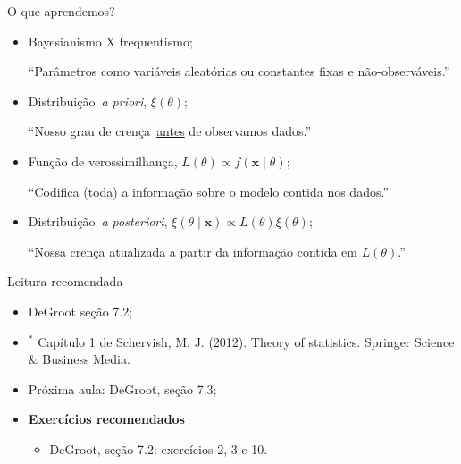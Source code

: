 \begin{frame}{O que aprendemos?}
\begin{itemize}
 \item[\faLightbulbO] Bayesianismo X frequentismo;
 
 ``Parâmetros como variáveis aleatórias ou constantes fixas e não-observáveis.''
 
 \item[\faHourglassStart] Distribuição~\textit{a priori}, $\xi(\theta)$;
 
 ``Nosso grau de crença~\underline{antes} de observamos dados.''
 
 \item[\faInfoCircle] Função de verossimilhança, $L(\theta) \propto f(\boldsymbol x \mid \theta)$;

 ``Codifica (toda) a informação sobre o modelo contida nos dados.''
 
 \item[\faHourglassEnd] Distribuição~\textit{a posteriori}, $\xi(\theta \mid \boldsymbol x) \propto L(\theta)\xi(\theta)$;
 
 ``Nossa crença atualizada a partir da informação contida em $L(\theta)$.''
 \end{itemize}
\end{frame}
\begin{frame}{Leitura recomendada}
\begin{itemize}
 \item[\faBook] DeGroot seção 7.2;
 \item[\faBook] $^\ast$ Capítulo 1 de Schervish, M. J. (2012). Theory of statistics. Springer Science \& Business Media.
 \item[\faForward] Próxima aula: DeGroot, seção 7.3;
 \item {\large\textbf{Exercícios recomendados}}
 \begin{itemize}
  \item[\faBookmark] DeGroot, seção 7.2: exercícios 2, 3 e 10. 
 \end{itemize}

\end{itemize} 
\end{frame}
